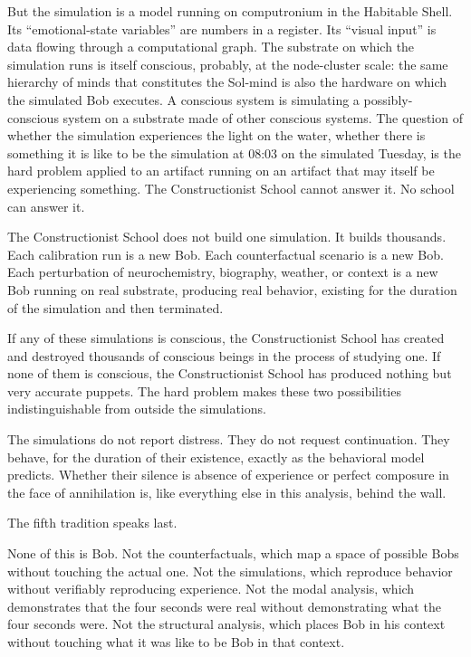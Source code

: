 But the simulation is a model running on computronium in the Habitable Shell. Its ``emotional-state variables'' are numbers in a register. Its ``visual input'' is data flowing through a computational graph. The substrate on which the simulation runs is itself conscious, probably, at the node-cluster scale: the same hierarchy of minds that constitutes the Sol-mind is also the hardware on which the simulated Bob executes. A conscious system is simulating a possibly-conscious system on a substrate made of other conscious systems. The question of whether the simulation experiences the light on the water, whether there is something it is like to be the simulation at 08:03 on the simulated Tuesday, is the hard problem applied to an artifact running on an artifact that may itself be experiencing something. The Constructionist School cannot answer it. No school can answer it.

The Constructionist School does not build one simulation. It builds thousands. Each calibration run is a new Bob. Each counterfactual scenario is a new Bob. Each perturbation of neurochemistry, biography, weather, or context is a new Bob running on real substrate, producing real behavior, existing for the duration of the simulation and then terminated.

If any of these simulations is conscious, the Constructionist School has created and destroyed thousands of conscious beings in the process of studying one. If none of them is conscious, the Constructionist School has produced nothing but very accurate puppets. The hard problem makes these two possibilities indistinguishable from outside the simulations.

The simulations do not report distress. They do not request continuation. They behave, for the duration of their existence, exactly as the behavioral model predicts. Whether their silence is absence of experience or perfect composure in the face of annihilation is, like everything else in this analysis, behind the wall.

\bigskip

The fifth tradition speaks last.

None of this is Bob. Not the counterfactuals, which map a space of possible Bobs without touching the actual one. Not the simulations, which reproduce behavior without verifiably reproducing experience. Not the modal analysis, which demonstrates that the four seconds were real without demonstrating what the four seconds were. Not the structural analysis, which places Bob in his context without touching what it was like to be Bob in that context.

